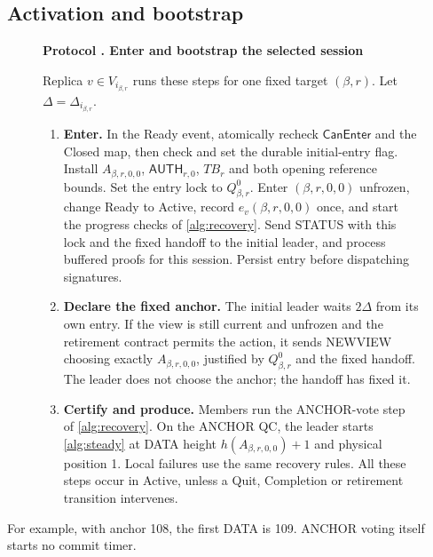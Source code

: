 \documentclass[11pt,a4paper]{article}
\newcommand{\TB}{\mathit{TB}}
\newcommand{\tagg}[1]{\ensuremath{\mathsf{#1}}}
\newcounter{protocol}
\newenvironment{protocol}[3][htbp]{\begin{figure}[#1]\refstepcounter{protocol}\label{#2}
\begin{mdframed}[linewidth=.6pt,skipabove=0pt,skipbelow=0pt,
innertopmargin=7pt,innerbottommargin=7pt]\small
\textbf{Protocol \theprotocol. #3}\par\smallskip}{\end{mdframed}\end{figure}}
\begin{document}
\subsection{Activation and bootstrap}
\label{sec:ready}
\begin{protocol}[H]{alg:bootstrap}{Enter and bootstrap the selected session}
Replica $v\in V_{i_{\beta,r}}$ runs these steps for one fixed target
$(\beta,r)$. Let $\Delta=\Delta_{i_{\beta,r}}$.
\begin{enumerate}[label=\textbf{\arabic*)},itemsep=3pt]
\item \textbf{Enter.} In the Ready event, atomically recheck
$\tagg{CanEnter}$ and the Closed map, then check and set the durable
initial-entry flag. Install $A_{\beta,r,0,0}$, $\tagg{AUTH}_{r,0}$,
$\TB_r$ and both opening reference bounds. Set the entry lock to
$Q^0_{\beta,r}$. Enter $(\beta,r,0,0)$ unfrozen, change Ready to Active,
record $e_v(\beta,r,0,0)$ once, and start the progress checks of
\cref{alg:recovery}. Send STATUS with this lock and the fixed handoff to
the initial leader, and process buffered proofs for this session.
Persist entry before dispatching signatures.
\item \textbf{Declare the fixed anchor.} The initial leader waits
$2\Delta$ from its own entry. If the view is still current and unfrozen
and the retirement contract permits the action, it sends NEWVIEW choosing
exactly $A_{\beta,r,0,0}$, justified by $Q^0_{\beta,r}$ and the fixed
handoff. The leader does not choose the anchor; the handoff has fixed it.
\item \textbf{Certify and produce.} Members run the ANCHOR-vote step of
\cref{alg:recovery}. On the ANCHOR QC, the leader starts
\cref{alg:steady} at DATA height $h(A_{\beta,r,0,0})+1$ and physical
position 1. Local failures use the same recovery rules. All these steps
occur in Active, unless a Quit, Completion or retirement transition
intervenes.
\end{enumerate}
\end{protocol}

For example, with anchor 108, the first DATA is 109. ANCHOR voting itself
starts no commit timer.
\end{document}
